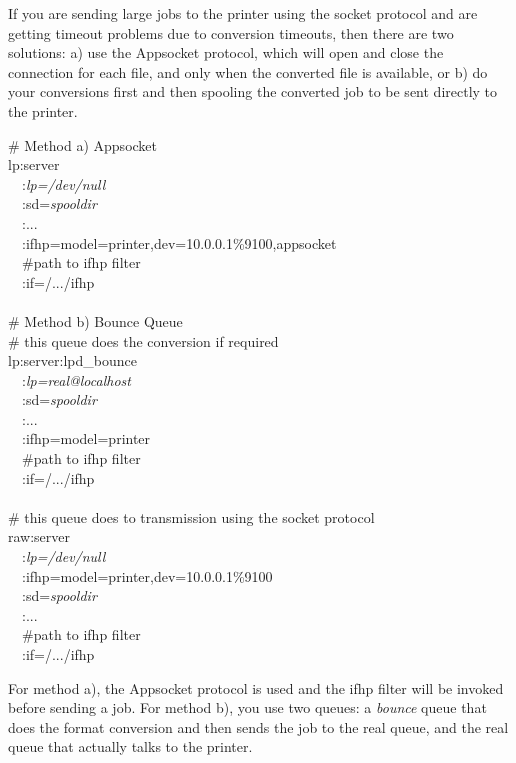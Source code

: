 \documentclass[a4paper]{article}
\begin{document}
If you are sending large jobs to the printer using the
{\ttfamily socket} protocol and are getting timeout
problems due to conversion timeouts,
then there are two solutions: a) use the Appsocket protocol,
which will open and close the connection for each file,
and only when the converted file is available,
or b)
do your conversions first and then spooling the converted job to be sent
directly to the printer.
\begin{tscreen}
\# Method a) Appsocket \\ 
lp:server  \\ 
~~:{\itshape lp=/dev/null\/}  \\ 
~~:sd={\itshape spooldir\/}  \\ 
~~:...  \\  
~~:ifhp=model=printer,dev=10.0.0.1\%9100,appsocket\\ 
~~\#path to ifhp filter  \\ 
~~:if=/.../ifhp  \\  \\ 
\# Method b) Bounce Queue \\ 
\#  this queue does the conversion if required \\ 
lp:server:lpd\_bounce  \\ 
~~:{\itshape lp=real@localhost\/}  \\ 
~~:sd={\itshape spooldir\/}  \\ 
~~:...  \\  
~~:ifhp=model=printer\\ 
~~\#path to ifhp filter  \\ 
~~:if=/.../ifhp  \\  \\ 
\# this queue does to transmission using the socket protocol \\ 
raw:server  \\ 
~~:{\itshape lp=/dev/null\/}  \\ 
~~:ifhp=model=printer,dev=10.0.0.1\%9100\\ 
~~:sd={\itshape spooldir\/}  \\ 
~~:...  \\  
~~\#path to ifhp filter  \\ 
~~:if=/.../ifhp  \\  
\end{tscreen}
 

For method a),
the Appsocket protocol is used and the {\ttfamily ifhp} filter will be invoked before sending a job.
For method b),
you use two queues:  a {\itshape bounce\/} queue that does the format conversion
and then sends the job to the real queue,
and the real queue that actually talks to the printer.
\end{document}
